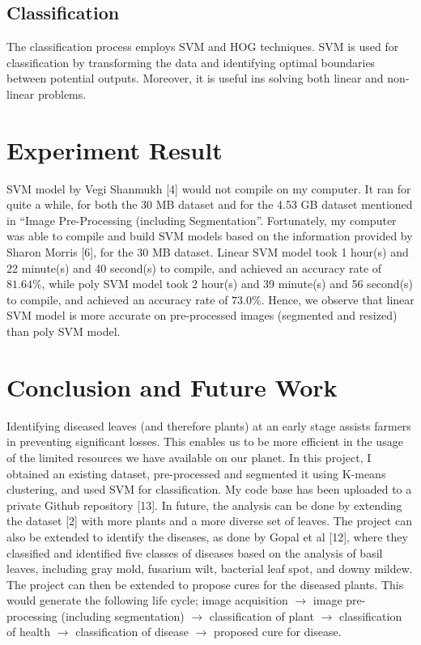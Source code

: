 \documentclass[twocolumn,10pt]{article}
\begin{document}
\begin{multicols}{2}
\begin{flushleft}
	
	\subsection{Classification}
	The classification process employs SVM and HOG techniques. SVM is used for classification by transforming the data and identifying optimal boundaries between potential outputs. Moreover, it is useful ins solving both linear and non-linear problems.\\
	
	\section{Experiment Result}
	SVM model by Vegi Shanmukh [4] would not compile on my computer. It ran for quite a while, for both the 30 MB dataset and for the 4.53 GB dataset mentioned in \enquote{Image Pre-Processing (including Segmentation}. Fortunately, my computer was able to compile and build SVM models based on the information provided by Sharon Morris [6], for the 30 MB dataset. Linear SVM model took 1 hour(s) and 22 minute(s) and 40 second(s) to compile, and achieved an accuracy rate of $81.64\%$, while poly SVM model took 2 hour(s) and 39 minute(s) and 56 second(s) to compile, and achieved an accuracy rate of $73.0\%$. Hence, we observe that linear SVM model is more accurate on pre-processed images (segmented and resized) than poly SVM model.\\
	
	\section{Conclusion and Future Work}
	Identifying diseased leaves (and therefore plants) at an early stage assists farmers in preventing significant losses. This enables us to be more efficient in the usage of the limited resources we have available on our planet. In this project, I obtained an existing dataset, pre-processed and segmented it using K-means clustering, and used SVM for classification. My code base has been uploaded to a private Github repository [13]. In future, the analysis can be done by extending the dataset [2] with more plants and a more diverse set of leaves. The project can also be extended to identify the diseases, as done by Gopal et al [12], where they classified and identified five classes of diseases based on the analysis of basil leaves, including gray mold, fusarium wilt, bacterial leaf spot, and downy mildew. The project can then be extended to propose cures for the diseased plants. This would generate the following life cycle; image acquisition $\rightarrow$ image pre-processing (including segmentation) $\rightarrow$ classification of plant $\rightarrow$ classification of health $\rightarrow$ classification of disease $\rightarrow$ proposed cure for disease.
\end{flushleft}



\end{multicols}
\end{document}
